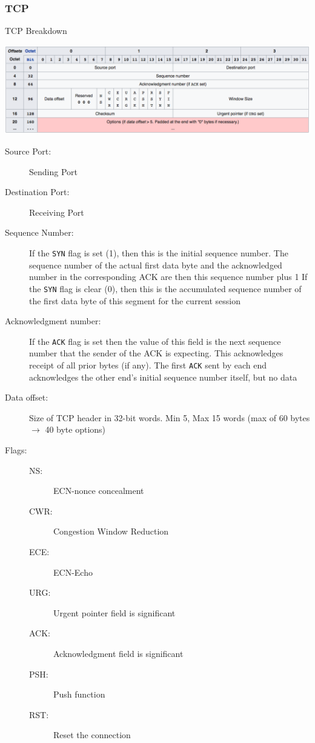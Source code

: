 \subsubsection{TCP}
\begin{table}[H]
	\centering
	\caption{TCP Breakdown}
	\includegraphics[width=\linewidth]{tcp}
\end{table}
\begin{description}
	\item[Source Port:] Sending Port
	\item[Destination Port:] Receiving Port
	\item[Sequence Number:] If the \texttt{SYN} flag is set (1), then this is the initial sequence number. The sequence number of the actual first data byte and the acknowledged number in the corresponding ACK are then this sequence number plus 1
	\subitem If the \texttt{SYN} flag is clear (0), then this is the accumulated sequence number of the first data byte of this segment for the current session
	\item[Acknowledgment number:] If the \texttt{ACK} flag is set then the value of this field is the next sequence number that the sender of the ACK is expecting. This acknowledges receipt of all prior bytes (if any). The first \texttt{ACK} sent by each end acknowledges the other end's initial sequence number itself, but no data
	\item[Data offset:] Size of TCP header in 32-bit words. Min 5, Max 15 words (max of 60 bytes $\rightarrow$ 40 byte options)
	\item[Flags:]
	\begin{description}
		\item[NS:] ECN-nonce concealment
		\item[CWR:] Congestion Window Reduction
		\item[ECE:] ECN-Echo
		\item[URG:] Urgent pointer field is significant
		\item[ACK:] Acknowledgment field is significant
		\item[PSH:] Push function
		\item[RST:] Reset the connection

\end{description}
\end{description}
